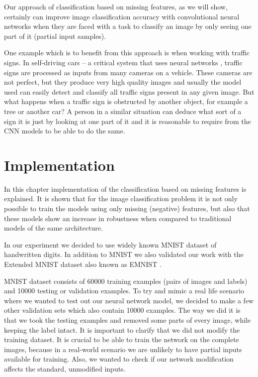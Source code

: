 \documentclass[b5paper]{book}
\let\cite\parencite
\begin{document}
Our approach of classification based on missing features, as we will show, certainly can improve image classification accuracy with convolutional neural networks when they are faced with a task to classify an image by only seeing one part of it (partial input samples).

One example which is to benefit from this approach is when working with traffic signs. In self-driving cars -- a critical system that uses neural networks \cite{bojarski2016end}, traffic signs are processed as inputs from many cameras on a vehicle. These cameras are not perfect, but they produce very high quality images and usually the model used can easily detect and classify all traffic signs present in any given image. But what happens when a traffic sign is obstructed by another object, for example a tree or another car? A person in a similar situation can deduce what sort of a sign it is just by looking at one part of it and it is reasonable to require from the CNN models to be able to do the same. 

\chapter{Implementation}

In this chapter implementation of the classification based on missing features is explained. It is shown that for the image classification problem it is not only possible to train the models using only missing (negative) features, but also that these models show an increase in robustness when compared to traditional models of the same architecture.

In our experiment we decided to use widely known MNIST \cite{lecun1998mnist} dataset of handwritten digits. In addition to MNIST we also validated our work with the Extended MNIST dataset also known as EMNIST \cite{cohen2017emnist}.

MNIST dataset consists of 60000 training examples (pairs of images and labels) and 10000 testing or validation examples. To try and mimic a real life scenario where we wanted to test out our neural network model, we decided to make a few other validation sets which also contain 10000 examples. The way we did it is that we took the testing examples and removed some parts of every image, while keeping the label intact. It is important to clarify that we did not modify the training dataset. It is crucial to be able to train the network on the complete images, because in a real-world scenario we are unlikely to have partial inputs available for training. Also, we wanted to check if our network modification affects the standard, unmodified inputs.
\end{document}
